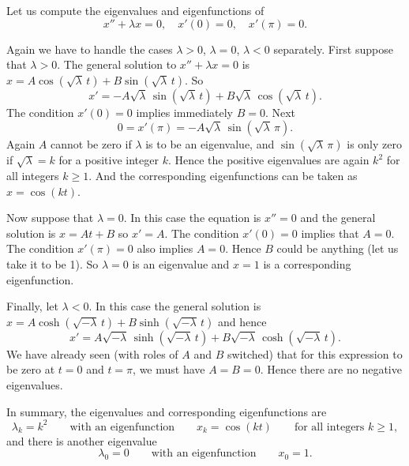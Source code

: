 \documentclass[12pt]{book}
\begin{document}
\begin{example}
Let us compute the 
 eigenvalues and eigenfunctions of
\begin{equation*}
x'' + \lambda x = 0, \quad x'(0) = 0, \quad x'(\pi) = 0 .
\end{equation*}

Again we have to handle the cases $\lambda > 0$, $\lambda = 0$, $\lambda
< 0$ separately.
First suppose that $\lambda > 0$.
The general solution to $x''+\lambda x = 0$ is
$x = A \cos (\! \sqrt{\lambda}\, t) + B \sin (\! \sqrt{\lambda}\, t)$.  So
\begin{equation*}
x' = -A\sqrt{\lambda}\, \sin (\! \sqrt{\lambda}\, t) + B\sqrt{\lambda}\,
\cos (\!\sqrt{\lambda}\, t) .
\end{equation*}
The condition $x'(0) = 0$ implies immediately $B = 0$.
Next
\begin{equation*}
0 = x'(\pi) = -A\sqrt{\lambda}\, \sin (\! \sqrt{\lambda}\, \pi) .
\end{equation*}
Again $A$ cannot be zero if $\lambda$ is to be an eigenvalue,
and $\sin (\! \sqrt{\lambda}\, \pi)$ is only zero
if
$\sqrt{\lambda} = k$ for a positive integer $k$.
Hence the positive eigenvalues are again
$k^2$ for all integers $k \geq 1$.  And the corresponding eigenfunctions
can be taken as $x=\cos (k t)$.

Now suppose that $\lambda = 0$.  In this case the equation is $x'' = 0$
and the general solution is $x = At + B$ so $x' = A$.  The condition
$x'(0) = 0$ implies that
$A=0$.  The condition $x'(\pi) = 0$ also implies $A=0$.
Hence $B$ could be anything (let us take it to be 1).  So $\lambda = 0$
is an eigenvalue and $x=1$ is a corresponding eigenfunction.

Finally, let $\lambda < 0$.  In this case the general solution is
$x = A \cosh (\! \sqrt{-\lambda}\, t) + B \sinh (\! \sqrt{-\lambda}\, t)$
and hence
\begin{equation*}
x' = A\sqrt{-\lambda}\, \sinh (\! \sqrt{-\lambda}\, t)
+ B\sqrt{-\lambda}\, \cosh (\! \sqrt{-\lambda}\, t ) .
\end{equation*}
We have already seen (with roles of $A$ and $B$ switched) that for this
expression to be zero at $t=0$ and $t=\pi$, we must have $A=B=0$.  Hence there are
no negative eigenvalues.

In summary, the eigenvalues and corresponding eigenfunctions are
\begin{equation*}
\lambda_k = k^2 \qquad \text{with an eigenfunction} \qquad x_k = \cos (k t)
\qquad \text{for all integers } k \geq 1 ,
\end{equation*}
and there is another eigenvalue
\begin{equation*}
\lambda_0 = 0 \qquad \text{with an eigenfunction} \qquad x_0 = 1.
\end{equation*}
\end{example}
\end{document}

